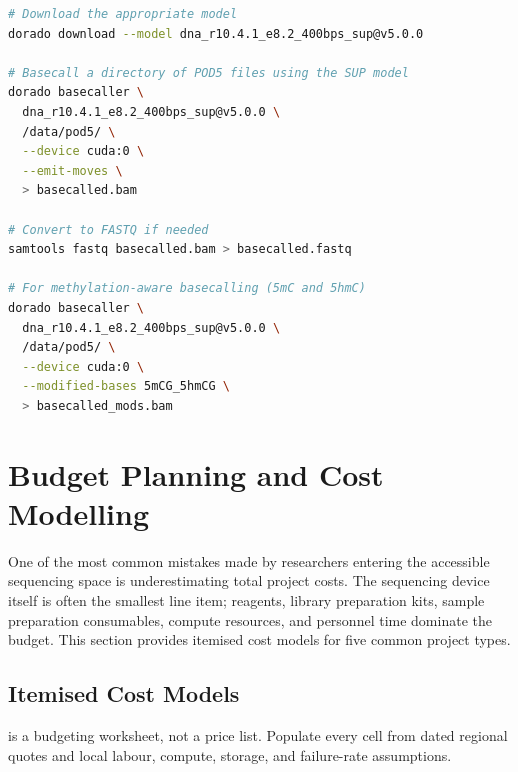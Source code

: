 \begin{lstlisting}[language=bash,caption={Basecalling with Dorado on a GPU workstation.},label=lst:dorado-basecall]
# Download the appropriate model
dorado download --model dna_r10.4.1_e8.2_400bps_sup@v5.0.0

# Basecall a directory of POD5 files using the SUP model
dorado basecaller \
  dna_r10.4.1_e8.2_400bps_sup@v5.0.0 \
  /data/pod5/ \
  --device cuda:0 \
  --emit-moves \
  > basecalled.bam

# Convert to FASTQ if needed
samtools fastq basecalled.bam > basecalled.fastq

# For methylation-aware basecalling (5mC and 5hmC)
dorado basecaller \
  dna_r10.4.1_e8.2_400bps_sup@v5.0.0 \
  /data/pod5/ \
  --device cuda:0 \
  --modified-bases 5mCG_5hmCG \
  > basecalled_mods.bam
\end{lstlisting}

\section{Budget Planning and Cost Modelling}
\label{sec:accessible:budget}

One of the most common mistakes made by researchers entering the accessible sequencing space is underestimating total project costs. The sequencing device itself is often the smallest line item; reagents, library preparation kits, sample preparation consumables, compute resources, and personnel time dominate the budget. This section provides itemised cost models for five common project types.

\subsection{Itemised Cost Models}
\label{subsec:accessible:costmodels}

\Cref{tab:accessible:costmodels} is a budgeting worksheet, not a price list. Populate every cell from dated regional quotes and local labour, compute, storage, and failure-rate assumptions.


